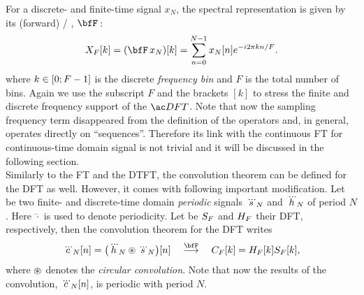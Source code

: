\mynewline
For a discrete- and finite-time signal $x_N$, the spectral representation is given by its (forward) \DFTdef/
,
$\discreteFT{}$:
\begin{equation}\label{eq:processing:dft}
    X_F[ k] = (\discreteFT{x_N})[k] =
    \sum_{n = 0}^{N - 1}
    x_N[ n]
    \cste^{-\csti2\pi k n / F}
    .
\end{equation}
where $k \in \kintervcc{0}{F - 1}$ is the discrete \textit{frequency bin} and $F$ is the total number of bins.
Again we use the subscript $F$ and the brackets $[k]$ to stress the finite and discrete frequency support of the $\DFT/$.
Note that now the sampling frequency term disappeared from the definition of the operators and, in general, operates directly on ``sequences''.
Therefore its link with the continuous \ac{FT} for continuous-time domain signal is not trivial and it will be discussed in the following section.
\\Similarly to the \ac{FT} and the \ac{DTFT}, the convolution theorem can be defined for the \ac{DFT} as well.
However, it comes with following important modification.
Let be two finite- and discrete-time domain \textit{periodic} signals $\dddot{s}_N$ and $\dddot{h}_N$ of period $N$.
Here $\dddot{\cdot}$ is used to denote periodicity.
Let be $S_F$ and $H_F$ their \ac{DFT}, respectively, then the convolution theorem for the \ac{DFT} writes
\begin{equation}\label{eq:processing:conv_dft}
    \dddot{\img}_N[n] = \kparen{\dddot{\rir}_N \circledast \dddot{\src}_N} [ n]
    \mathspace\overset{\discreteFT}{\kto}\mathspace
    \IMG_{F}[k] =  \FLT_{F}[k] \SRC_{F}[k]
    ,
\end{equation}
where $\circledast$ denotes the \textit{circular convolution}. Note that now the results of the convolution, $\dddot{c}_N[n]$, is periodic with period $N$.

